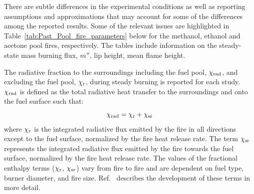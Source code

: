 \documentclass[12pt]{article}
\begin{document}
There are subtle differences in the experimental conditions as well as reporting assumptions and approximations that may account for some of the differences among the reported results. Some of the relevant issues are highlighted in Table~\ref{tab:Past_Pool_fire_parameters} below for the methanol, ethanol and acetone pool fires, respectively. The tables include information on the steady-state mass burning flux, $m''$, lip height, mean flame height.

The radiative fraction to the surroundings including the fuel pool, $\chi_{\rm {rad}}$, and excluding the fuel pool, $\chi_{\rm{r}}$, during steady burning is reported for each study. $\chi_{\rm{rad}}$ is defined as the total radiative heat transfer to the surroundings and onto the fuel surface such that:
\begin{equation}
\label{eq:chi_rad}
\chi_{\rm{rad}}=\chi_{\rm{r}}+\chi_{\rm{sr}}
\end{equation}
where $\chi_{\rm{r}}$ is the integrated radiative flux emitted by the fire in all directions except to the fuel surface, normalized by the fire heat release rate. The term $\chi_{\rm{sr}}$ represents the integrated radiative flux emitted by the fire towards the fuel surface, normalized by the fire heat release rate. The values of the fractional enthalpy terms ($\chi_{\rm{r}}$, $\chi_{\rm{sr}}$) vary from fire to fire and are dependent on fuel type, burner diameter, and fire size. Ref.~\cite{Kim2019} describes the development of these terms in more detail.
\end{document}
